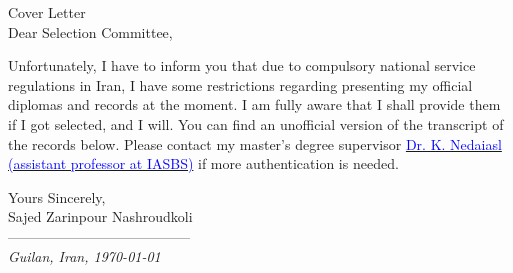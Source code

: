 \begin{cSection}{Cover Letter}
	\\	
	\vspace*{1em}
	\small
Dear Selection Committee, \vspace*{0.5em}

Unfortunately, I have to inform you that due to compulsory national service regulations in Iran, I have some restrictions regarding presenting my official diplomas and records at the moment. I am fully aware that I shall provide them if I got selected, and I will. You can find an unofficial version of the transcript of the records below. Please contact my master's degree supervisor \href{https://iasbs.ac.ir/personalpage?id=31016&staff=0}{\textcolor{blue}{Dr. K. Nedaiasl (assistant professor at IASBS)}} if more authentication is needed.

	\vspace*{1em}
Yours Sincerely,\\
Sajed Zarinpour Nashroudkoli\\
\normalsize
---------------------------------------\\
\tiny\textit{\scriptsize Guilan, Iran, \today}
\normalsize
\end{cSection}
